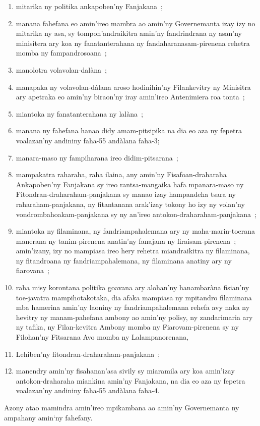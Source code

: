 \documentclass[12pt]{article}
\begin{document}
\begin{enumerate}
\item mitarika ny politika ankapoben'ny Fanjakana~;

\item manana fahefana eo amin'ireo mambra ao amin'ny Governemanta izay izy no
  mitarika ny asa, sy tompon'andraikitra amin'ny fandrindrana ny asan'ny
  minisitera ary koa ny fanatanterahana ny fandaharanasam-pirenena rehetra momba
  ny fampandrosoana~;

\item manolotra volavolan-dalàna~;

\item manapaka ny volavolan-dàlana aroso hodinihin'ny Filankevitry ny Minisitra
  ary apetraka eo amin'ny biraon'ny iray amin'ireo Antenimiera roa tonta~;

\item miantoka ny fanatanterahana ny lalàna~;

\item manana ny fahefana hanao didy amam-pitsipika na dia eo aza ny fepetra
  voalazan'ny andininy faha-55 andàlana faha-3;

\item manara-maso ny fampiharana ireo didim-pitsarana~;

\item mampakatra raharaha, raha ilaina, any amin'ny Fisafoan-draharaha
  Ankapoben'ny Fanjakana sy ireo rantsa-mangaika hafa mpanara-maso ny
  Fitondran-draharaham-panjakana sy manao izay hampandeha tsara ny
  raharaham-panjakana, ny fitantanana arak'izay tokony ho izy ny volan'ny
  vondrombahoakam-panjakana sy ny an'ireo antokon-draharaham-panjakana~;

\item miantoka ny filaminana, ny fandriampahalemana ary ny maha-marin-toerana
  manerana ny tanim-pirenena anatin'ny fanajana ny firaisam-pirenena~;
  amin'izany, izy no mampiasa ireo hery rehetra miandraikitra ny filaminana, ny
  fitandroana ny fandriampahalemana, ny filaminana anatiny ary ny fiarovana~;

\item raha misy korontana politika goavana ary alohan'ny hanambaràna fisian'ny
  toe-javatra mampihotakotaka, dia afaka mampiasa ny mpitandro filaminana mba
  hamerina amin'ny laoniny ny fandriampahalemana rehefa avy naka ny hevitry ny
  manam-pahefana ambony ao amin'ny polisy, ny zandarimaria ary ny tafika, ny
  Filan-kevitra Ambony momba ny Fiarovam-pirenena sy ny Filohan'ny Fitsarana Avo
  momba ny Lalampanorenana,

\item Lehiben'ny fitondran-draharaham-panjakana~;

\item manendry amin'ny fisahanan'asa sivily sy miaramila ary koa amin'izay
  antokon-draharaha miankina amin'ny Fanjakana, na dia eo aza ny fepetra
  voalazan'ny andininy faha-55 andàlana faha-4.
\end{enumerate}
\noindent
Azony atao mamindra amin'ireo mpikambana ao amin'ny Governemanta ny ampahany
amin‘ny fahefany.\\
\end{document}
